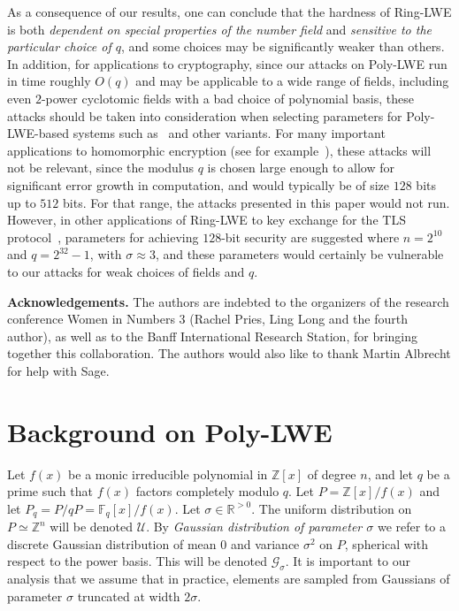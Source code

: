 \documentclass{llncs}
\newcommand{\FF}{\mathbb{F}}
\newcommand{\RR}{\mathbb{R}}
\newcommand{\ZZ}{\mathbb{Z}}
\newcommand{\<}{\langle}
\renewcommand{\>}{\rangle}
\begin{document}
As a consequence of our results, one can conclude that the hardness of Ring-LWE is both {\it dependent on special properties of the number field} and {\it sensitive to the particular choice of $q$}, and some choices may be significantly weaker than others.  In addition, for applications to cryptography, since our attacks on Poly-LWE run in time roughly $O(q)$ and may be applicable to a wide range of fields, including even $2$-power cyclotomic fields with a bad choice of polynomial basis, these attacks should be taken into consideration when selecting parameters for Poly-LWE-based systems such as~\cite{BV11,BGV11} and other variants. For many important applications to homomorphic encryption (see for example~\cite{GLN,BLN}), these attacks will not be relevant, since the modulus $q$ is chosen large enough to allow for significant error growth in computation, and would typically be of size $128$ bits up to $512$ bits.  For that range, the attacks presented in this paper would not run.  However, in other applications of  Ring-LWE to key exchange for the TLS protocol~\cite{BCNS},   parameters for achieving $128$-bit security are suggested where $n=2^{10}$ and $q=2^{32}-1$, with $\sigma \approx 3$, and these parameters would certainly be vulnerable to our attacks for weak choices of fields and $q$.


{\bf Acknowledgements.}  The authors are indebted to the organizers of the research conference Women in Numbers 3 (Rachel Pries, Ling Long and the fourth author), as well as to the Banff International Research Station, for bringing together this collaboration.
The authors would also like to thank Martin Albrecht for help with Sage.

\section{Background on Poly-LWE}


Let $f(x)$ be a monic irreducible polynomial in $\ZZ[x]$ of degree $n$, and let $q$ be a prime such that $f(x)$ factors completely modulo $q$.  Let $P = \ZZ[x]/f(x)$ and let $P_q = P/qP = \FF_q[x]/f(x)$.  Let $\sigma \in \RR^{>0}$.
The uniform distribution on $P \simeq \ZZ^n$ will be denoted $\mathcal{U}$.  By \emph{Gaussian distribution of parameter $\sigma$} we refer to a discrete Gaussian distribution of mean $0$ and variance $\sigma^2$ on $P$, spherical with respect to the power basis.  This will be denoted $\mathcal{G}_\sigma$.
It is important to our analysis that we assume that in practice, elements are sampled from Gaussians of parameter $\sigma$ truncated at width $2 \sigma$.
\end{document}
